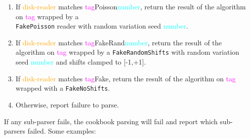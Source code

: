 \documentclass{article}
\begin{document}
\begin{itemize}
\begin{enumerate}
        \item If \textcolor{orange}{disk-reader} matches \textcolor{magenta}{tag}Poisson\textcolor{cyan}{number}, return the result of the algorithm on \textcolor{magenta}{tag} wrapped by a\\ \texttt{Fake\-Poisson} reader with random variation seed \textcolor{cyan}{number}.
        \item If \textcolor{orange}{disk-reader} matches \textcolor{magenta}{tag}FakeRand\textcolor{cyan}{number}, return the result of the algorithm on \textcolor{magenta}{tag} wrapped by a \texttt{Fake\-Random\-Shifts} with random variation seed \textcolor{cyan}{number} and shifts clamped to [-1,+1].
        \item If \textcolor{orange}{disk-reader} matches \textcolor{magenta}{tag}Fake, return the result of the algorithm on \textcolor{magenta}{tag} wrapped with a \texttt{Fake\-No\-Shifts}.
        \item Otherwise, report failure to parse.
    \end{enumerate}
\end{itemize}
If any sub-parser fails, the cookbook parsing will fail and report which sub-parsers failed. Some examples:
\end{document}
